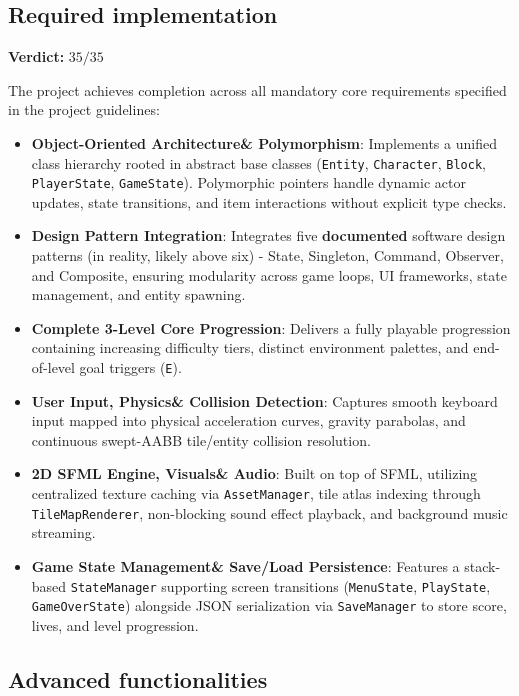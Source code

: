 \documentclass[12pt, a4paper]{article}
\begin{document}
\newpage

\subsection{Required implementation}

\textbf{Verdict:} $35/35$

The project achieves completion across all mandatory core requirements specified in the project guidelines:

\begin{itemize}
\item \textbf{Object-Oriented Architecture\& Polymorphism}: Implements a unified class hierarchy rooted in abstract base classes (\texttt{Entity}, \texttt{Character}, \texttt{Block}, \texttt{PlayerState}, \texttt{GameState}). Polymorphic pointers handle dynamic actor updates, state transitions, and item interactions without explicit type checks.
\item \textbf{Design Pattern Integration}: Integrates five \textbf{documented} software design patterns (in reality, likely above six) - State, Singleton, Command, Observer, and Composite, ensuring modularity across game loops, UI frameworks, state management, and entity spawning.
\item \textbf{Complete 3-Level Core Progression}: Delivers a fully playable progression containing increasing difficulty tiers, distinct environment palettes, and end-of-level goal triggers (\texttt{E}).
\item \textbf{User Input, Physics\& Collision Detection}: Captures smooth keyboard input mapped into physical acceleration curves, gravity parabolas, and continuous swept-AABB tile/entity collision resolution.
\item \textbf{2D SFML Engine, Visuals\& Audio}: Built on top of SFML, utilizing centralized texture caching via \texttt{AssetManager}, tile atlas indexing through \texttt{TileMapRenderer}, non-blocking sound effect playback, and background music streaming.
\item \textbf{Game State Management\& Save/Load Persistence}: Features a stack-based \texttt{StateManager} supporting screen transitions (\texttt{MenuState}, \texttt{PlayState}, \texttt{GameOverState}) alongside JSON serialization via \texttt{SaveManager} to store score, lives, and level progression.
\end{itemize}

\subsection{Advanced functionalities}
\end{document}
